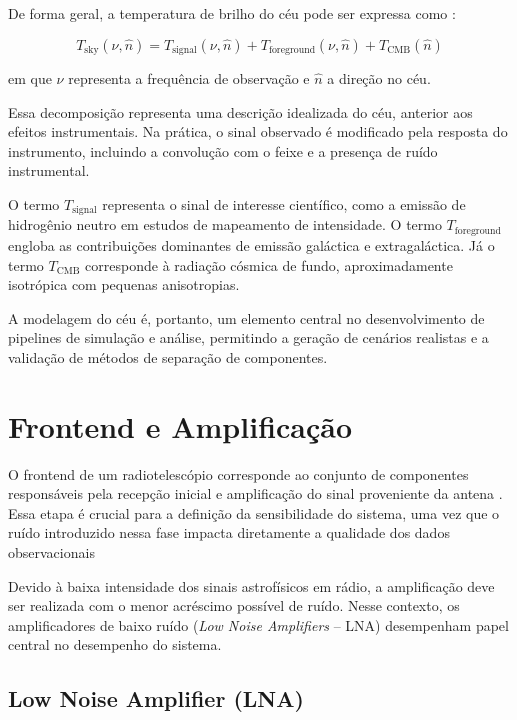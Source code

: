 De forma geral, a temperatura de brilho do céu pode ser expressa como \cite{mericia2019hi}:

\begin{equation}
T_{\mathrm{sky}}(\nu, \hat{n}) =
T_{\mathrm{signal}}(\nu, \hat{n}) +
T_{\mathrm{foreground}}(\nu, \hat{n}) +
T_{\mathrm{CMB}}(\hat{n})
\end{equation}

em que $\nu$ representa a frequência de observação e $\hat{n}$ a direção no céu.

Essa decomposição representa uma descrição idealizada do céu, anterior aos efeitos instrumentais. Na prática, o sinal observado é modificado pela resposta do instrumento, incluindo a convolução com o feixe e a presença de ruído instrumental.

O termo $T_{\mathrm{signal}}$ representa o sinal de interesse científico, como a emissão de hidrogênio neutro em estudos de mapeamento de intensidade. O termo $T_{\mathrm{foreground}}$ engloba as contribuições dominantes de emissão galáctica e extragaláctica. Já o termo $T_{\mathrm{CMB}}$ corresponde à radiação cósmica de fundo, aproximadamente isotrópica com pequenas anisotropias.

A modelagem do céu é, portanto, um elemento central no desenvolvimento de pipelines de simulação e análise, permitindo a geração de cenários realistas e a validação de métodos de separação de componentes.


\section{Frontend e Amplificação}

O frontend de um radiotelescópio corresponde ao conjunto de componentes responsáveis pela recepção inicial e amplificação do sinal proveniente da antena \cite{Pimental2022,mosquera2022eor}. Essa etapa é crucial para a definição da sensibilidade do sistema, uma vez que o ruído introduzido nessa fase impacta diretamente a qualidade dos dados observacionais

Devido à baixa intensidade dos sinais astrofísicos em rádio, a amplificação deve ser realizada com o menor acréscimo possível de ruído. Nesse contexto, os amplificadores de baixo ruído (\textit{Low Noise Amplifiers} – LNA) desempenham papel central no desempenho do sistema.

\subsection{Low Noise Amplifier (LNA)}

